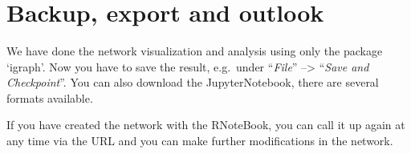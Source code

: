 \documentclass[11pt]{article}
\begin{document}
    \begin{center}
    \end{center}
    { \hspace*{\fill} \\}
    
    \begin{center}
    \end{center}
    { \hspace*{\fill} \\}
    
    \begin{center}
    \end{center}
    { \hspace*{\fill} \\}
    
    \begin{center}
    \end{center}
    { \hspace*{\fill} \\}
    
    \begin{center}
    \end{center}
    { \hspace*{\fill} \\}
    
    \hypertarget{backup-export-and-outlook}{%
\section{Backup, export and outlook}\label{backup-export-and-outlook}}

We have done the network visualization and analysis using only the
package `igraph'. Now you have to save the result, e.g.~under
``\emph{File}'' --\textgreater{} ``\emph{Save and Checkpoint}''. You can
also download the JupyterNotebook, there are several formats available.

If you have created the network with the RNoteBook, you can call it up
again at any time via the URL and you can make further modifications in
the network.
\end{document}

